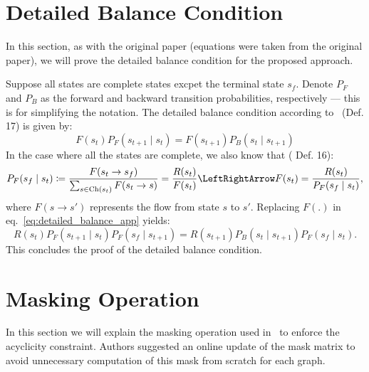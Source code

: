 \documentclass{lxaiproposal}
\begin{document}
    \makeappendix

    \appendix

    \renewcommand\theequation{\thesection\arabic{equation}}


    \section{Detailed Balance Condition}\label{app:detailed_balance}
    \vspace*{-3mm}

    In this section, as with the original paper (equations were taken from the original paper), we will prove the detailed balance condition
    for the proposed approach.

    Suppose all states are complete states excpet the terminal state $s_f$. Denote $P_F$ and $P_B$ as the forward
    and backward transition probabilities, respectively --- this is for simplifying the notation. The detailed balance
    condition according to~\cite{bengio2023gflownetfoundations} (Def. 17) is given by:
    \begin{equation}
        F(s_t)P_F(s_{t+1} \mid s_t) = F(s_{t+1})P_B(s_t \mid s_{t+1})
        \label{eq:detailed_balance_app}
    \end{equation}
    In the case where all the states are complete, we also know that (\cite{bengio2023gflownetfoundations} Def. 16):
    \[
        P_F(s_f \mid s_t) \coloneq \frac{F(s_t \to s_f)}{\sum_{s \in \text{Ch}(s_t)} F(s_t \to s)} = \frac{R(s_t)}{F(s_t)}
        \LeftRightArrow F(s_t) = \frac{R(s_t)}{P_F(s_f \mid s_t)},
    \]
    where $F(s \to s')$ represents the flow from state $s$ to  $s'$. Replacing $F(.)$ in eq.~\eqref{eq:detailed_balance_app}
    yields:
    \begin{equation}
        R(s_t)P_F(s_{t+1} \mid s_t)P_F(s_f \mid s_{t+1}) = R(s_{t+1})P_B(s_t \mid s_{t+1})P_F(s_f \mid s_t).
        \label{eq:detailed_balance_app2}
    \end{equation}
    This concludes the proof of the detailed balance condition.


    \section{Masking Operation}\label{app:masking}
    \vspace*{-3mm}

    In this section we will explain the masking operation used in~\cite{deleu2022daggflownet} to enforce the acyclicity
    constraint. Authors suggested an online update of the mask matrix to avoid unnecessary computation of this mask
    from scratch for each graph.
\end{document}
